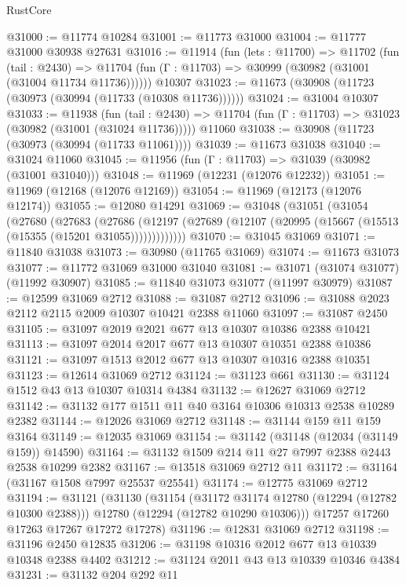 \begin{lexlean}{RustCore}
\begin{coremodule}
@31000 := @11774 @10284
@31001 := @11773 @31000
@31004 := @11777 @31000 @30938 @27631
@31016 := @11914
    (fun (lets : @11700) =>
    @11702
      (fun (tail : @2430) =>
      @11704 (fun (Γ : @11703) => @30999 (@30982 (@31001 (@31004 @11734 @11736))))))
    @10307
@31023 := @11673 (@30908 (@11723 (@30973 (@30994 (@11733 (@10308 @11736))))))
@31024 := @31004 @10307
@31033 := @11938
    (fun (tail : @2430) => @11704 (fun (Γ : @11703) => @31023 (@30982 (@31001 (@31024 @11736)))))
    @11060
@31038 := @30908 (@11723 (@30973 (@30994 (@11733 @11061))))
@31039 := @11673 @31038
@31040 := @31024 @11060
@31045 := @11956 (fun (Γ : @11703) => @31039 (@30982 (@31001 @31040)))
@31048 := @11969 (@12231 (@12076 @12232))
@31051 := @11969 (@12168 (@12076 @12169))
@31054 := @11969 (@12173 (@12076 @12174))
@31055 := @12080 @14291
@31069 := @31048
    (@31051
      (@31054
        (@27680
          (@27683
            (@27686
              (@12197 (@27689 (@12107 (@20995 (@15667 (@15513 (@15355 (@15201 @31055)))))))))))))
@31070 := @31045 @31069
@31071 := @11840 @31038
@31073 := @30980 (@11765 @31069)
@31074 := @11673 @31073
@31077 := @11772 @31069 @31000 @31040
@31081 := @31071 (@31074 @31077) (@11992 @30907)
@31085 := @11840 @31073 @31077 (@11997 @30979)
@31087 := @12599 @31069 @2712
@31088 := @31087 @2712
@31096 := @31088 @2023 @2112 @2115 @2009 @10307 @10421 @2388 @11060
@31097 := @31087 @2450
@31105 := @31097 @2019 @2021 @677 @13 @10307 @10386 @2388 @10421
@31113 := @31097 @2014 @2017 @677 @13 @10307 @10351 @2388 @10386
@31121 := @31097 @1513 @2012 @677 @13 @10307 @10316 @2388 @10351
@31123 := @12614 @31069 @2712
@31124 := @31123 @661
@31130 := @31124 @1512 @43 @13 @10307 @10314 @4384
@31132 := @12627 @31069 @2712
@31142 := @31132 @177 @1511 @11 @40 @3164 @10306 @10313 @2538 @10289 @2382
@31144 := @12026 @31069 @2712
@31148 := @31144 @159 @11 @159 @3164
@31149 := @12035 @31069
@31154 := @31142 (@31148 (@12034 (@31149 @159)) @14590)
@31164 := @31132 @1509 @214 @11 @27 @7997 @2388 @2443 @2538 @10299 @2382
@31167 := @13518 @31069 @2712 @11
@31172 := @31164 (@31167 @1508 @7997 @25537 @25541)
@31174 := @12775 @31069 @2712
@31194 := @31121
    (@31130
      (@31154
        (@31172 @31174 @12780 (@12294 (@12782 @10300 @2388)))
        @12780
        (@12294 (@12782 @10290 @10306)))
      @17257
      @17260
      @17263
      @17267
      @17272
      @17278)
@31196 := @12831 @31069 @2712
@31198 := @31196 @2450 @12835
@31206 := @31198 @10316 @2012 @677 @13 @10339 @10348 @2388 @4402
@31212 := @31124 @2011 @43 @13 @10339 @10346 @4384
@31231 := @31132
    @204
    @292
    @11

\end{coremodule}
\end{lexlean}
